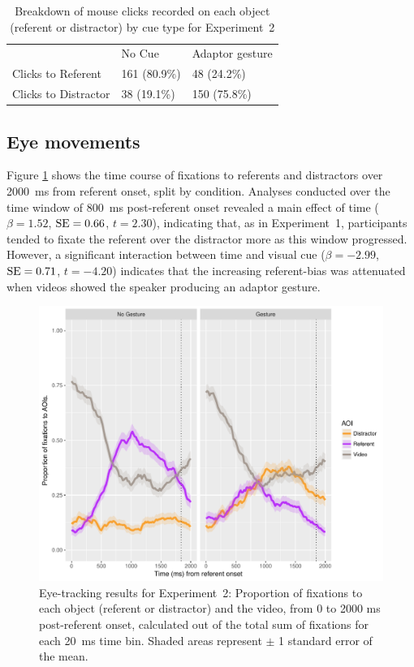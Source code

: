 \documentclass[a4paper,man,natbib]{apa6}
\newcommand{\resultsLM}[3]{$\beta = #1$, $\textnormal{SE} = #2$, $t #3$}
\begin{document}
\begin{table}
\caption{Breakdown of mouse clicks recorded on each object (referent or distractor) by cue type for Experiment~2}
\label{table:v2_clicks}
\begin{tabularx}{\linewidth}{YYY}
\hline
& No Cue & Adaptor gesture \\
Clicks to Referent & 161 (80.9\%) & 48 (24.2\%)  \\
Clicks to Distractor & 38 (19.1\%) & 150 (75.8\%)  \\
\hline
\end{tabularx}
\end{table}


\subsection{Eye movements}
Figure \ref{fig:v2_eye} shows the time course of fixations to referents and distractors over 2000~ms from referent onset, split by condition.
Analyses conducted over the time window of 800~ms post-referent onset revealed a main effect of time (\resultsLM{1.52}{0.66}{=2.30}), indicating that, as in Experiment~1, participants tended to fixate the referent over the distractor more as this window progressed.
However, a significant interaction between time and visual cue (\resultsLM{-2.99}{0.71}{=-4.20}) indicates that the increasing referent-bias was attenuated when videos showed the speaker producing an adaptor gesture. 

\begin{figure}[Ht]
  \centering
	\includegraphics[width=\linewidth]{./img/e8_fixations.pdf}
  \caption{Eye-tracking results for Experiment~2: Proportion of fixations to each object (referent or distractor) and the video, from 0 to 2000 ms post-referent onset, calculated out of the total sum of fixations for each 20~ms time bin. Shaded areas represent $\pm$ 1 standard error of the mean.}
  \label{fig:v2_eye}
\end{figure}
\end{document}
